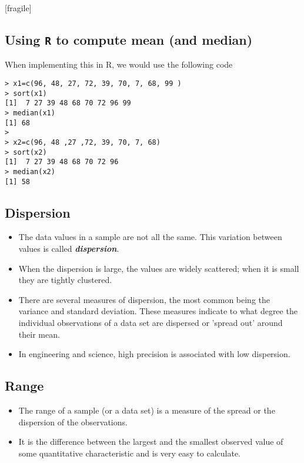 \documentclass[]{report}
\begin{document}
[fragile]
\subsection{Using \texttt{R} to compute mean (and median)}
When implementing this in R, we would use the following code

\begin{verbatim}
> x1=c(96, 48, 27, 72, 39, 70, 7, 68, 99 )
> sort(x1)
[1]  7 27 39 48 68 70 72 96 99
> median(x1)
[1] 68
>
> x2=c(96, 48 ,27 ,72, 39, 70, 7, 68)
> sort(x2)
[1]  7 27 39 48 68 70 72 96
> median(x2)
[1] 58
\end{verbatim}


{
\subsection{Dispersion }

\begin{itemize}
\item The data values in a sample are not all the same. This variation between values is called \textbf{ \emph{dispersion}}.

\item When the dispersion is large, the values are widely scattered; when it is small they are tightly clustered.


\item
There are several measures of dispersion, the most common being the variance and  standard deviation. These measures indicate to what degree the individual observations of a data set are dispersed or 'spread out' around their mean.

\item
In engineering and science, high precision is associated with low dispersion.
\end{itemize}

\subsection{Range}

\begin{itemize}
\item The range of a sample (or a data set) is a measure of the spread or the dispersion of the observations. \item It is the difference between the largest and the smallest observed value of some quantitative characteristic and is very easy to calculate.


\end{itemize}}
\end{document}
